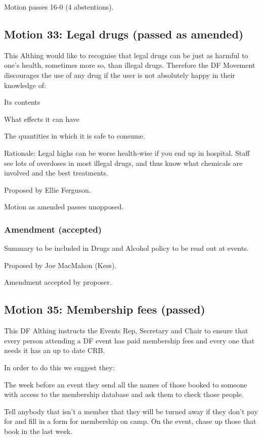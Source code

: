 \documentclass[a4paper, 12pt]{article}
\begin{document}
Motion passes 16-0 (4 abstentions).

\subsection{Motion 33: Legal drugs (passed as amended)}
This Althing would like to recognise that legal drugs can be just as harmful to one's health, sometimes more so, than illegal drugs. Therefore the DF Movement discourages the use of any drug if the user is not absolutely happy in their knowledge of:
\begin{enumerate*}
	\item Its contents
	\item What effects it can have
	\item The quantities in which it is safe to consume.
\end{enumerate*}

Rationale: Legal highs can be worse health-wise if you end up in hospital. Staff see lots of overdoses in most illegal drugs, and thus know what chemicals are involved and the best treatments.

Proposed by Ellie Ferguson.

Motion as amended passes unopposed.

\subsubsection{Amendment (accepted)}
Summary to be included in Drugs and Alcohol policy to be read out at events.

Proposed by Joe MacMahon (Kess).

Amendment accepted by proposer.

\subsection{Motion 35: Membership fees (passed)}
This DF Althing instructs the Events Rep, Secretary and Chair to ensure that every person attending a DF event has paid membership fees and every one that needs it has an up to date CRB.

In order to do this we suggest they:
\begin{enumerate*}
	\item The week before an event they send all the names of those booked to someone with access to the membership database and ask them to check those people.
	\item Tell anybody that isn't a member that they will be turned away if they don't pay for and fill in a form for membership on camp. On the event, chase up those that book in the last week.
\end{enumerate*}
\end{document}
